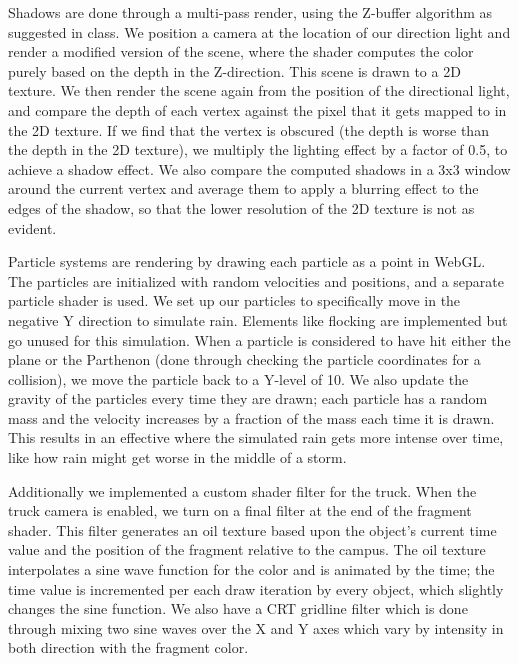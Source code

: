 \documentclass[10pt,letterpaper,oneside]{article}
\numberwithin{equation}{section}		%
\numberwithin{figure}{section}			%
\numberwithin{table}{section}				%
\begin{document}

Shadows are done through a multi-pass render, using the Z-buffer algorithm as suggested in class. We position a camera at the location of our direction light and render a modified version of the scene, where the shader computes the color purely based on the depth in the Z-direction. This scene is drawn to a 2D texture. We then render the scene again from the position of the directional light, and compare the depth of each vertex against the pixel that it gets mapped to in the 2D texture. If we find that the vertex is obscured (the depth is worse than the depth in the 2D texture), we multiply the lighting effect by a factor of 0.5, to achieve a shadow effect. We also compare the computed shadows in a 3x3 window around the current vertex and average them to apply a blurring effect to the edges of the shadow, so that the lower resolution of the 2D texture is not as evident.

Particle systems are rendering by drawing each particle as a point in WebGL. The particles are initialized with random velocities and positions, and a separate particle shader is used. We set up our particles to specifically move in the negative Y direction to simulate rain. Elements like flocking are implemented but go unused for this simulation. When a particle is considered to have hit either the plane or the Parthenon (done through checking the particle coordinates for a collision), we move the particle back to a Y-level of 10. We also update the gravity of the particles every time they are drawn; each particle has a random mass and the velocity increases by a fraction of the mass each time it is drawn. This results in an effective where the simulated rain gets more intense over time, like how rain might get worse in the middle of a storm.


Additionally we implemented a custom shader filter for the truck. When the truck camera is enabled, we turn on a final filter at the end of the fragment shader. This filter generates an oil texture based upon the object's current time value and the position of the fragment relative to the campus. The oil texture interpolates a sine wave function for the color and is animated by the time; the time value is incremented per each draw iteration by every object, which slightly changes the sine function. We also have a CRT gridline filter which is done through mixing two sine waves over the X and Y axes which vary by intensity in both direction with the fragment color.
\end{document}

